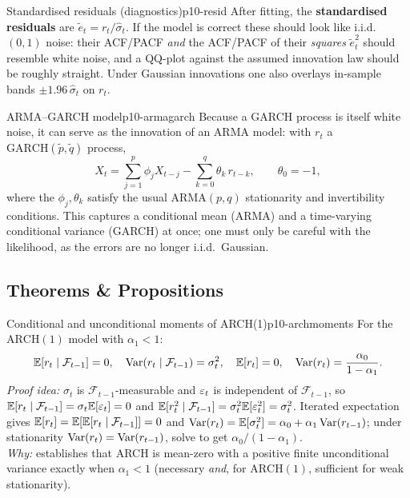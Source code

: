\begin{definition}{Standardised residuals (diagnostics)}{p10-resid}
After fitting, the \textbf{standardised residuals} are
$\tilde e_t=r_t/\hat\sigma_t$. If the model is correct these should look like
i.i.d.\ $(0,1)$ noise: their ACF/PACF \emph{and} the ACF/PACF of their
\emph{squares} $\tilde e_t^2$ should resemble white noise, and a QQ-plot against
the assumed innovation law should be roughly straight. Under Gaussian
innovations one also overlays in-sample bands $\pm1.96\,\hat\sigma_t$ on $r_t$.
\end{definition}

\begin{definition}{ARMA--GARCH model}{p10-armagarch}
Because a GARCH process is itself white noise, it can serve as the innovation of
an ARMA model: with $r_t$ a $\mathrm{GARCH}(\tilde p,\tilde q)$ process,
\[
X_t=\sum_{j=1}^{p}\phi_j X_{t-j}-\sum_{k=0}^{q}\theta_k\,r_{t-k},
\qquad \theta_0=-1,
\]
where the $\phi_j,\theta_k$ satisfy the usual $\mathrm{ARMA}(p,q)$ stationarity
and invertibility conditions. This captures a conditional mean (ARMA) and a
time-varying conditional variance (GARCH) at once; one must only be careful with
the likelihood, as the errors are no longer i.i.d.\ Gaussian.
\end{definition}

\subsection{Theorems \& Propositions}

\begin{proposition}{Conditional and unconditional moments of ARCH(1)}{p10-archmoments}
For the $\mathrm{ARCH}(1)$ model with $\alpha_1<1$:
\[
\mathbb{E}[r_t\mid\mathcal F_{t-1}]=0,\quad
\operatorname{Var}(r_t\mid\mathcal F_{t-1})=\sigma_t^2,\quad
\mathbb{E}[r_t]=0,\quad
\operatorname{Var}(r_t)=\frac{\alpha_0}{1-\alpha_1}.
\]
\textit{Proof idea:} $\sigma_t$ is $\mathcal F_{t-1}$-measurable and $\varepsilon_t$ is
independent of $\mathcal F_{t-1}$, so
$\mathbb{E}[r_t\mid\mathcal F_{t-1}]=\sigma_t\mathbb{E}[\varepsilon_t]=0$ and
$\mathbb{E}[r_t^2\mid\mathcal F_{t-1}]=\sigma_t^2\mathbb{E}[\varepsilon_t^2]=\sigma_t^2$. Iterated
expectation gives $\mathbb{E}[r_t]=\mathbb{E}[\mathbb{E}[r_t\mid\mathcal F_{t-1}]]=0$ and
$\operatorname{Var}(r_t)=\mathbb{E}[\sigma_t^2]=\alpha_0+\alpha_1\operatorname{Var}(r_{t-1})$; under stationarity
$\operatorname{Var}(r_t)=\operatorname{Var}(r_{t-1})$, solve to get $\alpha_0/(1-\alpha_1)$.\\
\textit{Why:} establishes that ARCH is mean-zero with a positive finite
unconditional variance exactly when $\alpha_1<1$ (necessary \emph{and}, for
$\mathrm{ARCH}(1)$, sufficient for weak stationarity).
\end{proposition}

